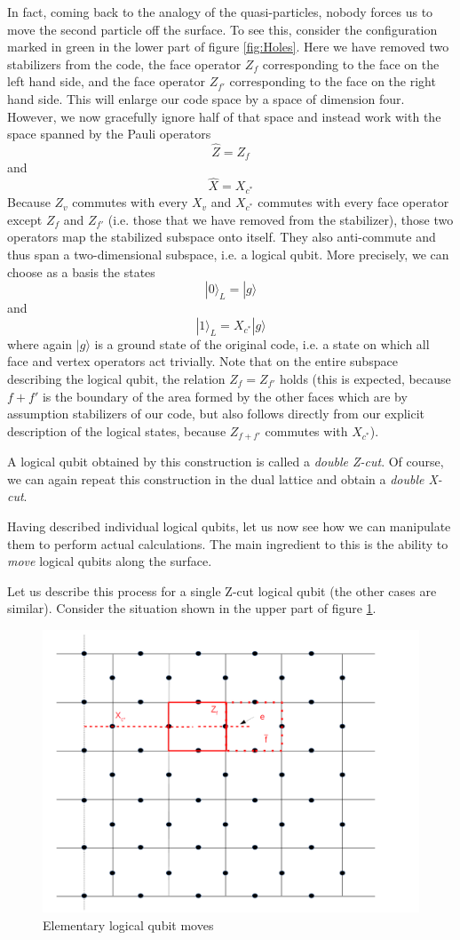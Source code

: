 \documentclass[a4paper, draft]{article}
\theoremstyle{own}
\theoremstyle{remark}
\begin{document}
In fact, coming back to the analogy of the quasi-particles, nobody forces us to move the second particle off the surface. To see this, consider the configuration marked in green in the lower part of figure \ref{fig:Holes}. Here we have removed two stabilizers from the code, the face operator $Z_f$ corresponding to the face on the left hand side, and the face operator $Z_{f'}$ corresponding to the face on the right hand side. This will enlarge our code space by a space of dimension four. However, we now gracefully ignore half of that space and instead work with the space spanned by the Pauli operators
$$
\hat{Z} = Z_f 
$$
and
$$
\hat{X} = X_{c^*} 
$$
Because $Z_v$ commutes with every $X_v$ and $X_{c^*}$ commutes with every face operator except $Z_f$ and $Z_{f'}$ (i.e. those that we have removed from the stabilizer), those two operators map the stabilized subspace onto itself. They also anti-commute and thus span a two-dimensional subspace, i.e. a logical qubit. More precisely, we can choose as a basis the states
$$
|0 \rangle_L = |g \rangle
$$
and
$$
|1 \rangle_L = X_{c^*} |g \rangle
$$
where again $|g \rangle$ is a ground state of the original code, i.e. a state on which all face and vertex operators act trivially. Note that on the entire subspace describing the logical qubit, the relation $Z_f = Z_{f'}$ holds (this is expected, because $f + f'$ is the boundary of the area formed by the other faces which are by assumption stabilizers of our code, but also follows directly from our explicit description of the logical states, because $Z_{f+f'}$ commutes with $X_{c^*}$).

A logical qubit obtained by this construction is called a \emph{double Z-cut}. Of course, we can again repeat this construction in the dual lattice and obtain a \emph{double X-cut}.

Having described individual logical qubits, let us now see how we can manipulate them to perform actual calculations. The main ingredient to this is the ability to \emph{move} logical qubits along the surface.

Let us describe this process for a single Z-cut logical qubit (the other cases are similar). Consider the situation shown in the upper part of figure \ref{fig:ElementaryMove}.

\begin{figure}[ht]
\centering
\includegraphics[width=0.7\linewidth]{images/ElementaryMove}
\caption[Elementary logical qubit moves]{Elementary logical qubit moves}
\label{fig:ElementaryMove}
\end{figure}
\end{document}
